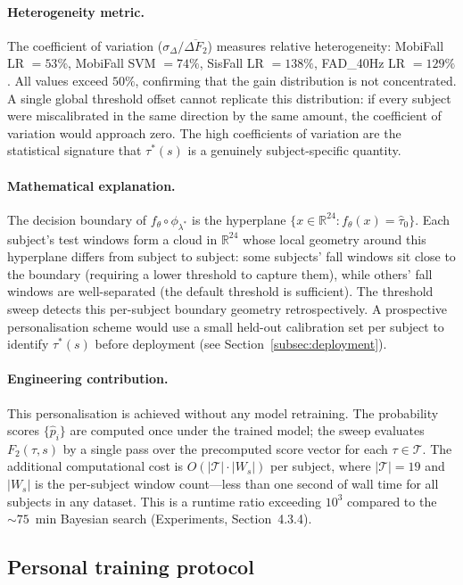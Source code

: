 \documentclass[onluarkali,ingilizce,yukseklisans,karton,LisansustuEgitim]{itutez}
\providecommand{\R}{\mathbb{R}}
\providecommand{\1}{\mathbf{1}}
\providecommand{\T}{\mathcal{T}}
\begin{document}
\paragraph{Heterogeneity metric.}
The coefficient of variation ($\sigma_\Delta / \overline{\Delta F_2}$) measures
relative heterogeneity: MobiFall LR $=53\%$, MobiFall SVM $=74\%$, SisFall
LR $=138\%$, FAD\_40Hz LR $=129\%$.  All values exceed $50\%$, confirming that
the gain distribution is not concentrated.  A single global threshold offset
cannot replicate this distribution: if every subject were miscalibrated in the
same direction by the same amount, the coefficient of variation would approach
zero.  The high coefficients of variation are the statistical signature that
$\tau^*(s)$ is a genuinely subject-specific quantity.

\paragraph{Mathematical explanation.}
The decision boundary of $f_\theta\circ\phi_{\lambda^*}$ is the hyperplane
$\{x\in\R^{24}\colon f_\theta(x)=\hat\tau_0\}$.  Each subject's test windows form
a cloud in $\R^{24}$ whose local geometry around this hyperplane differs from subject
to subject: some subjects' fall windows sit close to the boundary (requiring a lower
threshold to capture them), while others' fall windows are well-separated (the default
threshold is sufficient).  The threshold sweep detects this per-subject boundary
geometry retrospectively.  A prospective personalisation scheme would use a small
held-out calibration set per subject to identify $\tau^*(s)$ before deployment
(see Section~\ref{subsec:deployment}).

\paragraph{Engineering contribution.}
This personalisation is achieved without any model retraining.  The probability
scores $\{\hat p_i\}$ are computed once under the trained model; the sweep evaluates
$F_2(\tau, s)$ by a single pass over the precomputed score vector for each $\tau
\in\T$.  The additional computational cost is $O(|\T|\cdot|W_s|)$ per subject,
where $|\T|=19$ and $|W_s|$ is the per-subject window count---less than one second
of wall time for all subjects in any dataset.  This is a runtime ratio exceeding
$10^3$ compared to the ${\sim}75$~min Bayesian search (Experiments,
Section~4.3.4).

\subsection{Personal training protocol}
\label{subsubsec:personal-protocol}
\end{document}
